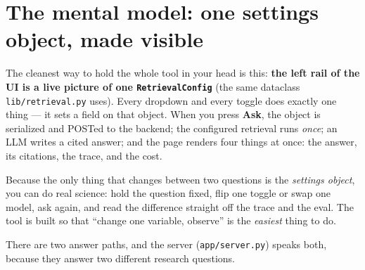\documentclass[11pt]{article}
\newcommand{\code}[1]{\texttt{#1}}
\begin{document}
\section{The mental model: one settings object, made visible}

The cleanest way to hold the whole tool in your head is this: \textbf{the left
rail of the UI is a live picture of one \code{RetrievalConfig}} (the same
dataclass \code{lib/retrieval.py} uses). Every dropdown and every toggle does
exactly one thing --- it sets a field on that object. When you press
\textbf{Ask}, the object is serialized and POSTed to the backend; the configured
retrieval runs \emph{once}; an LLM writes a cited answer; and the page renders
four things at once: the answer, its citations, the trace, and the cost.

\begin{ideabox}
Because the only thing that changes between two questions is the \emph{settings
object}, you can do real science: hold the question fixed, flip one toggle or
swap one model, ask again, and read the difference straight off the trace and
the eval. The tool is built so that ``change one variable, observe'' is the
\emph{easiest} thing to do.
\end{ideabox}

There are two answer paths, and the server (\code{app/server.py}) speaks both,
because they answer two different research questions.
\end{document}
